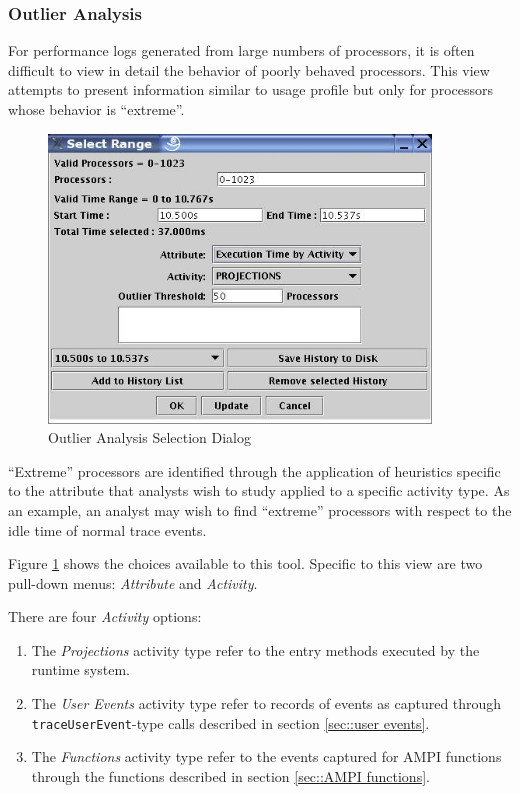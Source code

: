 \subsubsection{Outlier Analysis}
\label{sec::outlier}

For performance logs generated from large numbers of processors, it is
often difficult to view in detail the behavior of poorly behaved
processors. This view attempts to present information similar to usage
profile but only for processors whose behavior is ``extreme''.

\begin{figure}[htb]
\center
\includegraphics[width=4.0in]{fig/outlier_dialog}
\caption{Outlier Analysis Selection Dialog}
\label{outlier dialog}
\end{figure}

``Extreme'' processors are identified through the application of
heuristics specific to the attribute that analysts wish to study
applied to a specific activity type. As an example, an analyst may
wish to find ``extreme'' processors with respect to the idle time of
normal \charmpp{} trace events. 

Figure \ref{outlier dialog} shows the choices available to this
tool. Specific to this view are two pull-down menus: {\em Attribute}
and {\em Activity}.

There are four {\em Activity} options:
\begin{enumerate}
\item The {\em Projections} activity type refer to the entry methods 
executed by the \charmpp{} runtime system.
\item The {\em User Events} activity type refer to records of events
as captured through {\tt traceUserEvent}-type calls described in
section \ref{sec::user events}.
\item The {\em Functions} activity type refer to the events captured
for AMPI functions through the functions described in section
\ref{sec::AMPI functions}.
\end{enumerate}


